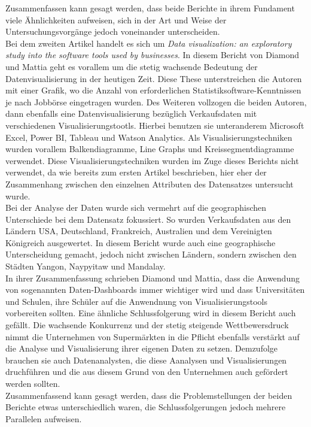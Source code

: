 \documentclass[usegeometry=true]{scrartcl}
\begin{document}
Zusammenfassen kann gesagt werden, dass beide Berichte in ihrem Fundament viele Ähnlichkeiten aufweisen, sich in der Art und Weise der Untersuchungsvorgänge jedoch voneinander
unterscheiden.\\
\noindent Bei dem zweiten Artikel handelt es sich um \textit{Data visualization: an exploratory study into the software tools used by businesses}.\cite{diamond2017data}
In diesem Bericht von Diamond und Mattia geht es vorallem um die stetig wachsende Bedeutung der Datenvisualisierung in der heutigen Zeit. Diese These unterstreichen die Autoren
mit einer Grafik, wo die Anzahl von erforderlichen Statistiksoftware-Kenntnissen je nach Jobbörse eingetragen wurden. Des Weiteren vollzogen die beiden Autoren, dann ebenfalls
eine Datenvisualisierung bezüglich Verkaufsdaten mit verschiedenen Visualisierungstootls. Hierbei benutzen sie unteranderem Microsoft Excel, Power BI, Tableau und
Watson Analytics. Als Visualisierungstechniken wurden vorallem Balkendiagramme, Line Graphs und Kreissegmentdiagramme verwendet. Diese Visualisierungstechniken wurden im Zuge
dieses Berichts nicht verwendet, da wie bereits zum ersten Artikel beschrieben, hier eher der Zusammenhang zwischen den einzelnen Attributen des Datensatzes untersucht wurde.\\
Bei der Analyse der Daten wurde sich vermehrt auf die geographischen Unterschiede bei dem Datensatz fokussiert. So wurden Verkaufsdaten aus den Ländern USA, Deutschland,
Frankreich, Australien und dem Vereinigten Königreich ausgewertet. In diesem Bericht wurde auch eine geographische Unterscheidung gemacht, jedoch nicht zwischen Ländern,
sondern zwischen den Städten Yangon, Naypyitaw und Mandalay.
\\ In ihrer Zusammenfassung schrieben Diamond und Mattia, dass die Anwendung von sogenannten Daten-Dashboards immer wichtiger wird und dass Universitäten und Schulen, ihre Schüler
auf die Anwendnung von Visualisierungstools vorbereiten sollten. Eine ähnliche Schlussfolgerung wird in diesem Bericht auch gefällt. Die wachsende Konkurrenz und der stetig steigende
Wettbewersdruck nimmt die Unternehmen von Supermärkten in die Pflicht ebenfalls verstärkt auf die Analyse und Visualisierung ihrer eigenen Daten zu setzen. Demzufolge brauchen
sie auch Datenanalysten, die diese Aanalysen und Visualisierungen druchführen und die aus diesem Grund von den Unternehmen auch gefördert werden sollten.\\
Zusammenfassend kann gesagt werden, dass die Problemstellungen der beiden Berichte etwas unterschiedlich waren, die Schlussfolgerungen jedoch mehrere Parallelen aufweisen.
\end{document}
